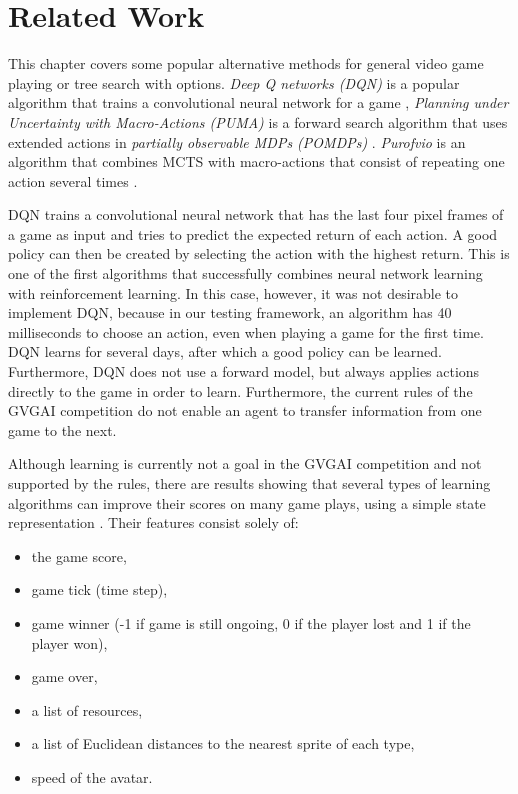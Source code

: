 \chapter{Related Work}
\label{sec:related}
This chapter covers some popular alternative methods for general video game
playing or tree search with options. \emph{Deep Q networks (DQN)} is a popular
algorithm that trains a convolutional neural network for a game
\cite{mnih2013playing}, \emph{Planning under Uncertainty with Macro-Actions
(PUMA)} is a forward search algorithm that uses extended actions in
\emph{partially observable MDPs (POMDPs)} \cite{he2010puma}.  \emph{Purofvio} is
an algorithm that combines MCTS with macro-actions that consist of repeating one
action several times \cite{powley2012monte}. 

DQN trains a convolutional neural network that has the last four pixel frames of
a game as input and tries to predict the expected return of each action. A good
policy can then be created by selecting the action with the highest return. This
is one of the first algorithms that successfully combines neural network
learning with reinforcement learning. In this case, however, it was not
desirable to implement DQN, because in our testing framework, an algorithm has
40 milliseconds to choose an action, even when playing a game for the first
time. DQN learns for several days, after which a good policy can be learned.
Furthermore, DQN does not use a forward model, but always applies actions
directly to the game in order to learn. Furthermore, the current rules of the
GVGAI competition do not enable an agent to transfer information from one game
to the next.

Although learning is currently not a goal in the GVGAI competition and not
supported by the rules, there are results showing that several types of learning
algorithms can improve their scores on many game plays, using a simple state
representation \cite{samothrakis2015neuroevolution}. Their features consist
solely of: 

\begin{itemize}[noitemsep]
	\item the game score, 
	\item game tick (time step),
	\item game winner (-1 if game is still ongoing, 0 if the player lost and 1 if the player won), 
	\item game over, 
	\item a list of resources, 
	\item a list of Euclidean distances to the nearest sprite of each type,
	\item speed of the avatar. 
\end{itemize}

